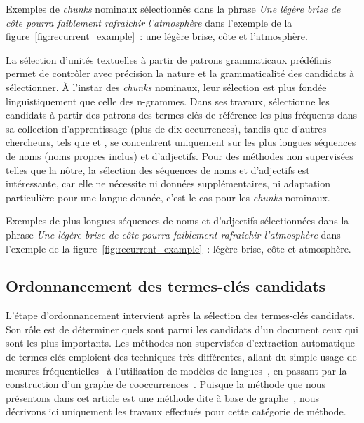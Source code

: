     Exemples de \textit{chunks} nominaux sélectionnés dans la phrase
    \textit{\og{}Une légère brise de côte pourra faiblement rafraichir
    l'atmosphère\fg{}} dans l'exemple de la figure~\ref{fig:recurrent_example}~: \og{}une légère brise\fg{},
    \og{}côte\fg{} et \og{}l'atmosphère\fg{}.

    La sélection d'unités textuelles à partir de patrons grammaticaux prédéfinis
    permet de contrôler avec précision la nature et la grammaticalité des
    candidats à sélectionner. À l'instar des \textit{chunks} nominaux, leur
    sélection est plus fondée linguistiquement que celle des n-grammes. Dans ses
    travaux,  sélectionne les candidats à
    partir des patrons des termes-clés de référence les plus fréquents dans sa
    collection d'apprentissage (plus de dix occurrences), tandis que d'autres
    chercheurs, tels que  et
    , se concentrent uniquement sur les plus
    longues séquences de noms (noms propres inclus) et d'adjectifs. Pour des
    méthodes non supervisées telles que la nôtre, la sélection des séquences de
    noms et d'adjectifs est intéressante, car elle ne nécessite ni données
    supplémentaires, ni adaptation particulière pour une langue donnée,
    c'est le cas pour les \textit{chunks} nominaux.

    Exemples de plus longues séquences de noms et d'adjectifs
    sélectionnées dans la phrase \textit{\og{}Une légère brise de côte pourra faiblement
    rafraichir l'atmosphère\fg{}} dans l'exemple de la
    figure~\ref{fig:recurrent_example}~:
    \og{}légère brise\fg{}, \og{}côte\fg{} et \og{}atmosphère\fg{}.

  \subsection{Ordonnancement des termes-clés candidats}
  \label{subsec:ordonnancement_des_termes_cles_candidats}
    L'étape d'ordonnancement intervient après la sélection des termes-clés
    candidats. Son rôle est de déterminer quels sont parmi les candidats d'un
    document ceux qui sont les plus importants.
    Les méthodes non supervisées d'extraction automatique de termes-clés
    emploient des techniques très différentes, allant du simple usage de mesures
    fréquentielles~\cite{paukkeri2010likey} à l'utilisation de modèles de
    langues~\cite{tomokiyo2003languagemodel}, en passant par la construction
    d'un graphe de cooccurrences~\cite{mihalcea2004textrank}. Puisque la méthode
    que nous présentons dans cet article est une méthode dite \og à base de
    graphe~\fg, nous décrivons ici uniquement les travaux effectués pour cette
    catégorie de méthode.

